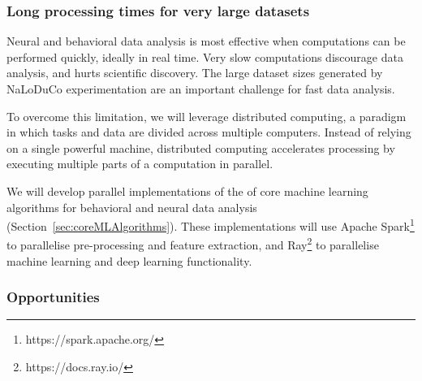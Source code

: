 \documentclass[12pt]{article}
\begin{document}
\subsubsection*{Long processing times for very large datasets}

Neural and behavioral data analysis is most effective when computations can be
performed quickly, ideally in real time. Very slow computations discourage data
analysis, and hurts scientific discovery. The large dataset sizes generated by
NaLoDuCo experimentation are an important challenge for fast data analysis.

To overcome this limitation, we will leverage distributed computing, a paradigm
in which tasks and data are divided across multiple computers. Instead of
relying on a single powerful machine, distributed computing accelerates
processing by executing multiple parts of a computation in parallel.

We will develop parallel implementations of the of core machine learning
algorithms for behavioral and neural data analysis (Section~\ref{sec:coreMLAlgorithms}).
These implementations will use Apache Spark\footnote{https://spark.apache.org/}
to parallelise pre-processing and feature extraction, and
Ray\footnote{https://docs.ray.io/} to parallelise machine learning and deep
learning functionality.

\subsubsection{Opportunities}
\end{document}
